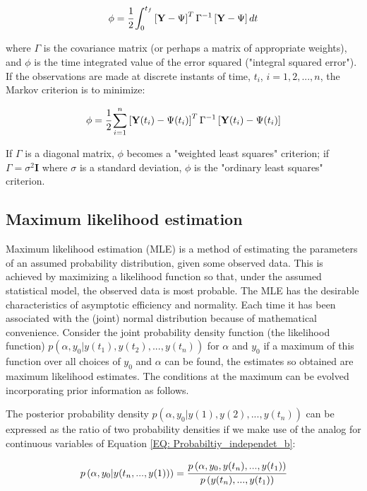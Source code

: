 \documentclass[a4paper,fleqn]{cas-dc}
\begin{document}
\begin{equation}
	\phi =  \cfrac{1}{2} \int_{0}^{t_f}  \left[ \textbf{Y} - \Psi \right]^T \Gamma^{-1} \left[ \textbf{Y} - \Psi \right] dt
\end{equation}

where $\Gamma$ is the covariance matrix (or perhaps a matrix of appropriate weights), and $\phi$ is the time integrated value of the error squared ("integral squared error"). If the observations are made at discrete instants of time, $t_i$, $i = 1,2,...,n$, the Markov criterion is to minimize:

\begin{equation}
	\phi = \cfrac{1}{2} \sum_{i=1}^{n} \left[ \textbf{Y}(t_i) - \Psi(t_i) \right]^T \Gamma^{-1} \left[ \textbf{Y}(t_i) - \Psi(t_i) \right] 
\end{equation}

If $\Gamma$ is a diagonal matrix, $\phi$  becomes a "weighted least squares" criterion; if $\Gamma = \sigma^2 \textbf{I}$ where $\sigma$ is a standard deviation, $\phi$ is the "ordinary least squares" criterion.

\subsection{Maximum likelihood estimation}

Maximum likelihood estimation (MLE) is a method of estimating the parameters of an assumed probability distribution, given some observed data. This is achieved by maximizing a likelihood function so that, under the assumed statistical model, the observed data is most probable. The MLE has the desirable characteristics of asymptotic efficiency and normality. Each time it has been associated with the (joint) normal distribution because of mathematical convenience. Consider the joint probability density function (the likelihood function) $p(\alpha, y_0|y(t_1),y(t_2),...,y(t_n))$ for $\alpha$ and $y_0$ if a maximum of this function over all choices of $y_0$ and $\alpha$ can be found, the estimates so obtained are maximum likelihood estimates. The conditions at the maximum can be evolved incorporating prior information as follows.

The posterior probability density $p(\alpha,y_0|y(1),y(2),...,y(t_n))$ can be expressed as the ratio of two probability densities if we make use of the analog for continuous variables of Equation \ref{EQ: Probabiltiy_independet_b}:

\begin{equation} \label{EQ: Posterior_distribution}
	p\left( \alpha,y_0|y(t_n,...,y(1)) \right) = \cfrac{p\left( \alpha, y_0, y(t_n),...,y(t_1) \right)}{p\left( y(t_n),...,y(t_1) \right)}
\end{equation}
\end{document}
